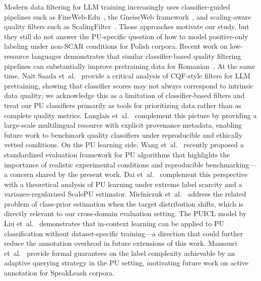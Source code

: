 \documentclass[applsci,article,accept,pdftex,moreauthors]{Definitions/mdpi}
\newcommand{\rev}[1]{{#1}}
\begin{document}
\rev{Modern data filtering for LLM training increasingly uses classifier-guided pipelines such as FineWeb-Edu~\cite{penedo2024fineweb}, the GneissWeb framework~\cite{emami2026gneissweb}, and scaling-aware quality filters such as ScalingFilter~\cite{li2024scalingfilter}.} \rev{Those approaches motivate our study, but they still do not answer the PU-specific question of how to model positive-only labeling under non-SCAR conditions for Polish corpora.} \rev{Recent work on low-resource languages demonstrates that similar classifier-based quality filtering pipelines can substantially improve pretraining data for Romanian~\cite{negoita2026romanianllm}.} \rev{At the same time, Nait Saada et~al.~\cite{saada2026cqf} provide a critical analysis of CQF-style filters for LLM pretraining, showing that classifier scores may not always correspond to intrinsic data quality; we acknowledge this as a limitation of classifier-based filters and treat our PU classifiers primarily as tools for prioritizing data rather than as complete quality metrics.} \rev{Langlais et~al.~\cite{langlais2026commoncorpus} complement this picture by providing a large-scale multilingual resource with explicit provenance metadata, enabling future work to benchmark quality classifiers under reproducible and ethically vetted conditions.} \rev{On the PU learning side, Wang et~al.~\cite{wang2026pubenchmark} recently proposed a standardized evaluation framework for PU algorithms that highlights the importance of realistic experimental conditions and reproducible benchmarking---a concern shared by the present work.} \rev{Dai et~al.~\cite{dai2026scalepu} complement this perspective with a theoretical analysis of PU learning under extreme label scarcity and a variance-regularized ScalePU estimator.} \rev{Mielniczuk et~al.~\cite{mielniczuk2026priorshift} address the related problem of class-prior estimation when the target distribution shifts, which is directly relevant to our cross-domain evaluation setting.} \rev{The PUICL model by Liu et~al.~\cite{liu2026puicl} demonstrates that in-context learning can be applied to PU classification without dataset-specific training---a direction that could further reduce the annotation overhead in future extensions of this work.} \rev{Mansouri et~al.~\cite{mansouri2026activepu} provide formal guarantees on the label complexity achievable by an adaptive querying strategy in the PU setting, motivating future work on active annotation for SpeakLeash corpora.}
\end{document}
